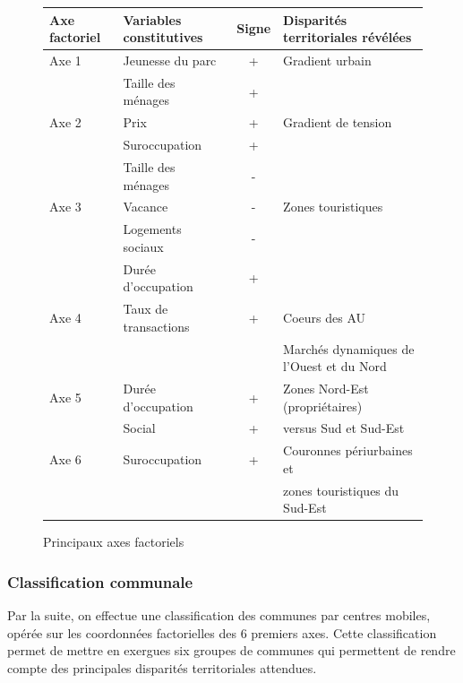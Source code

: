 \documentclass[12pt, a4paper]{article}
\begin{document}
\begin{figure}[H]
\caption{Principaux axes factoriels}
\begin{tabular}{| l | l | c | l |}
\hline
Axe factoriel & Variables constitutives       & Signe &  Disparités territoriales révélées \\
\hline
Axe 1         &Jeunesse du parc               & +    & Gradient urbain \\
              &  Taille des ménages             & +  &    \\
\hline
Axe 2         &Prix                           & +    & Gradient de tension \\
       & Suroccupation                  & +    & \\ 
      &Taille des ménages             & -  &   \\
\hline
Axe 3         &Vacance                        & -    & Zones touristiques \\
        &Logements sociaux              & -    &  \\
        &Durée d'occupation             & +    & \\
\hline
Axe 4         &Taux de transactions           & +    & Coeurs des AU  \\
                                           &  & & Marchés dynamiques de l'Ouest et du Nord \\
\hline
Axe 5         &Durée d'occupation             & +    & Zones Nord-Est (propriétaires) \\
        &Social                         & +    & versus Sud et Sud-Est \\
\hline
Axe 6         & Suroccupation                  & +    & Couronnes périurbaines et \\
                 & &                &  zones touristiques du Sud-Est \\
\hline
\end{tabular}
\end{figure} 

\vspace{.2cm}


\subsubsection{Classification communale}


Par la suite, on effectue une classification des communes par centres mobiles, opérée sur les coordonnées factorielles des 6 premiers axes. Cette classification permet de mettre en exergues six groupes de communes qui permettent de rendre compte des principales disparités territoriales attendues. 
\end{document}
